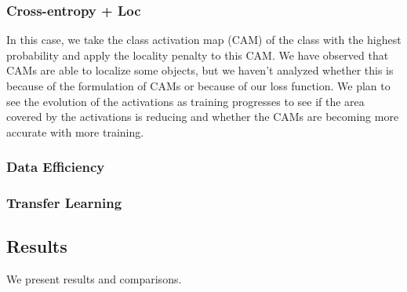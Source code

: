 \subsubsection{Cross-entropy + Loc}
In this case, we take the class activation map (CAM) of the class with the highest probability and
apply the locality penalty to this CAM. We have observed that CAMs
are able to localize some objects, but we haven't analyzed whether this is because of the
formulation of CAMs or because of our loss function. We plan to see the evolution of the
activations as training progresses to see if the area covered by the activations is reducing and
whether the CAMs are becoming more accurate with more training. 

\subsubsection{Data Efficiency}





\subsubsection{Transfer Learning}


\subsection{Results}
We present results and comparisons.

